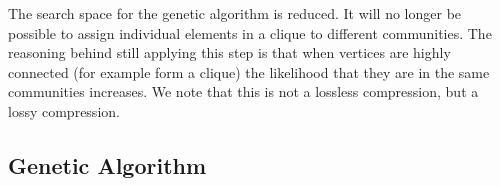 The search space for the genetic algorithm is reduced. 
It will no longer be possible to assign individual elements in a clique to different communities.
The reasoning behind still applying this step is that when vertices are highly connected (for example form a clique) the likelihood that they are in the same communities increases. 
We note that this is not a lossless compression, but a lossy compression.

\subsection{Genetic Algorithm}